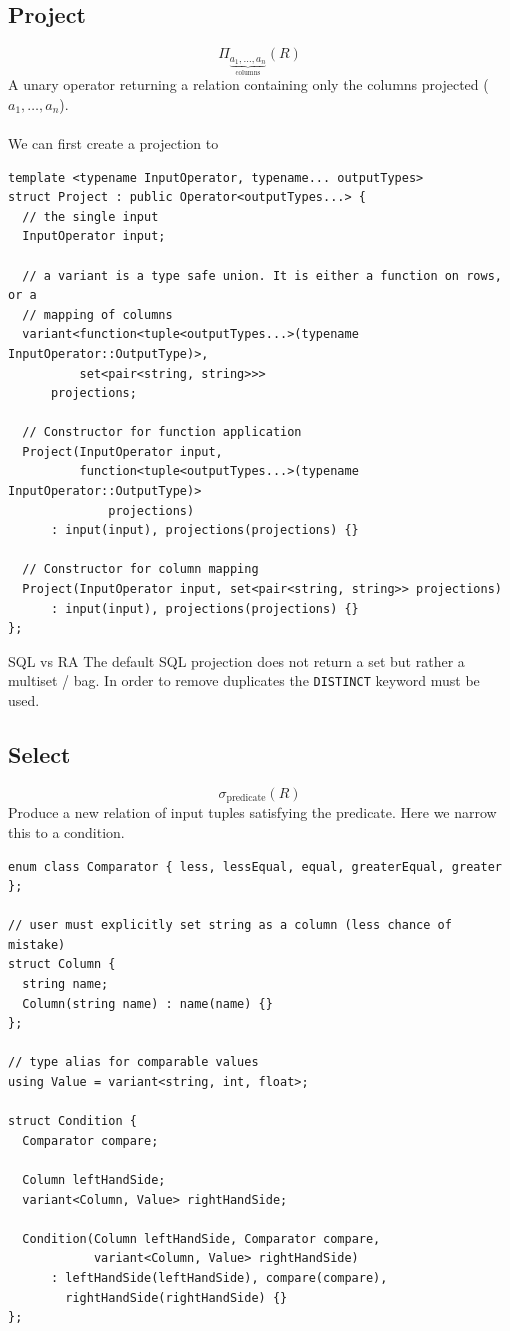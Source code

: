 \subsection{Project}
\[\Pi_{\underbrace{{a_1, \dots, a_n}}_\text{columns}}(R)\]
A unary operator returning a relation containing only the columns projected ($a_1, \dots, a_n$).
\\
\\ We can first create a projection to 
\begin{verbatim}
template <typename InputOperator, typename... outputTypes>
struct Project : public Operator<outputTypes...> {
  // the single input
  InputOperator input;

  // a variant is a type safe union. It is either a function on rows, or a 
  // mapping of columns 
  variant<function<tuple<outputTypes...>(typename InputOperator::OutputType)>,
          set<pair<string, string>>>
      projections;

  // Constructor for function application
  Project(InputOperator input,
          function<tuple<outputTypes...>(typename InputOperator::OutputType)>
              projections)
      : input(input), projections(projections) {}

  // Constructor for column mapping
  Project(InputOperator input, set<pair<string, string>> projections)
      : input(input), projections(projections) {}
};
\end{verbatim}

\begin{sidenotebox}{SQL vs RA}
  The default SQL projection does not return a set but rather a multiset / bag. In order to remove duplicates the \texttt{DISTINCT} keyword must be used.
\end{sidenotebox}

\subsection{Select}
\[\sigma_{\text{predicate}}(R) \]
Produce a new relation of input tuples satisfying the predicate. Here we narrow this to a condition.

\begin{verbatim}
enum class Comparator { less, lessEqual, equal, greaterEqual, greater };

// user must explicitly set string as a column (less chance of mistake)
struct Column {
  string name;
  Column(string name) : name(name) {}
};

// type alias for comparable values
using Value = variant<string, int, float>;

struct Condition {
  Comparator compare;

  Column leftHandSide;
  variant<Column, Value> rightHandSide;

  Condition(Column leftHandSide, Comparator compare,
            variant<Column, Value> rightHandSide)
      : leftHandSide(leftHandSide), compare(compare),
        rightHandSide(rightHandSide) {}
};
\end{verbatim}

